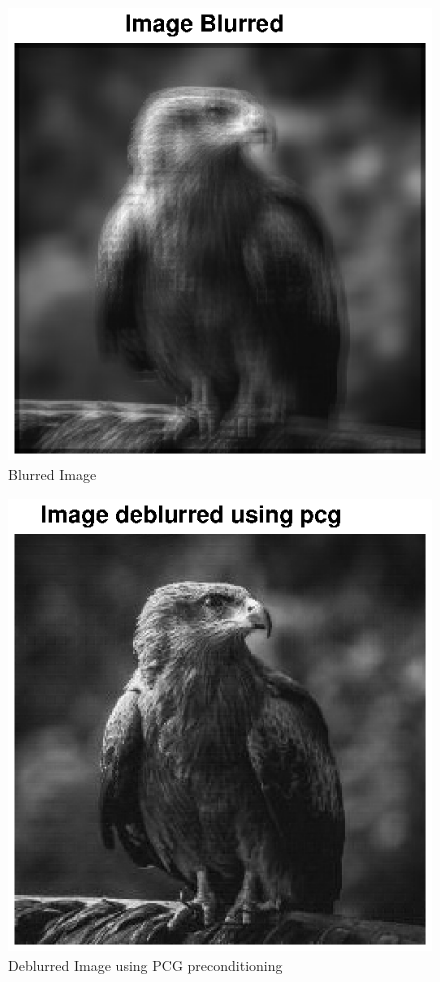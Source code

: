 \documentclass[unicode,11pt,a4paper,oneside,numbers=endperiod,openany]{scrartcl}
\begin{document}
\begin{figure}[H]
    \centering
    \caption{Blurred Image}
    \label{fig:ex4-5-blurred}
    \includegraphics[width=\textwidth, trim={0cm 0cm 0cm 0cm}, clip]{./figures/ex4-5-blurred.eps}
\end{figure}

\begin{figure}[H]
    \centering
    \caption{Deblurred Image using PCG preconditioning}
    \label{fig:ex4-6-pcg}
    \includegraphics[width=\textwidth, trim={0cm 0cm 0cm 0cm}, clip]{./figures/ex4-6-pcg.eps}
\end{figure}
\end{document}
